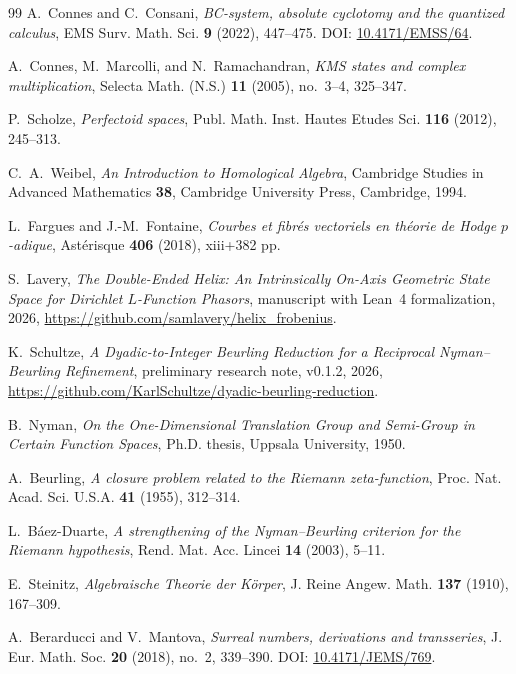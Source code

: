 \documentclass[11pt]{amsart}
\numberwithin{equation}{section}
\theoremstyle{definition}
\begin{document}
\begin{thebibliography}{99}
A.~Connes and C.~Consani,
\emph{BC-system, absolute cyclotomy and the quantized calculus},
EMS Surv. Math. Sci. \textbf{9} (2022), 447--475.
DOI: \href{https://doi.org/10.4171/EMSS/64}{10.4171/EMSS/64}.

A.~Connes, M.~Marcolli, and N.~Ramachandran,
\emph{KMS states and complex multiplication},
Selecta Math. (N.S.) \textbf{11} (2005), no.~3--4, 325--347.

P.~Scholze,
\emph{Perfectoid spaces},
Publ. Math. Inst. Hautes Etudes Sci. \textbf{116} (2012), 245--313.

C.~A.~Weibel,
\emph{An Introduction to Homological Algebra},
Cambridge Studies in Advanced Mathematics \textbf{38},
Cambridge University Press, Cambridge, 1994.

L.~Fargues and J.-M.~Fontaine,
\emph{Courbes et fibr\'es vectoriels en th\'eorie de Hodge $p$-adique},
Ast\'erisque \textbf{406} (2018), xiii+382 pp.

S.~Lavery,
\emph{The Double-Ended Helix: An Intrinsically On-Axis Geometric State
Space for Dirichlet $L$-Function Phasors},
manuscript with Lean~4 formalization, 2026,
\url{https://github.com/samlavery/helix_frobenius}.

K.~Schultze,
\emph{A Dyadic-to-Integer Beurling Reduction for a Reciprocal
Nyman--Beurling Refinement},
preliminary research note, v0.1.2, 2026,
\url{https://github.com/KarlSchultze/dyadic-beurling-reduction}.

B.~Nyman,
\emph{On the One-Dimensional Translation Group and Semi-Group in Certain
Function Spaces},
Ph.D. thesis, Uppsala University, 1950.

A.~Beurling,
\emph{A closure problem related to the Riemann zeta-function},
Proc. Nat. Acad. Sci. U.S.A. \textbf{41} (1955), 312--314.

L.~B\'aez-Duarte,
\emph{A strengthening of the Nyman--Beurling criterion for the Riemann
hypothesis},
Rend. Mat. Acc. Lincei \textbf{14} (2003), 5--11.

E.~Steinitz,
\emph{Algebraische Theorie der K\"orper},
J. Reine Angew. Math. \textbf{137} (1910), 167--309.

A.~Berarducci and V.~Mantova,
\emph{Surreal numbers, derivations and transseries},
J. Eur. Math. Soc. \textbf{20} (2018), no.~2, 339--390.
DOI: \href{https://doi.org/10.4171/JEMS/769}{10.4171/JEMS/769}.


\end{thebibliography}
\end{document}
